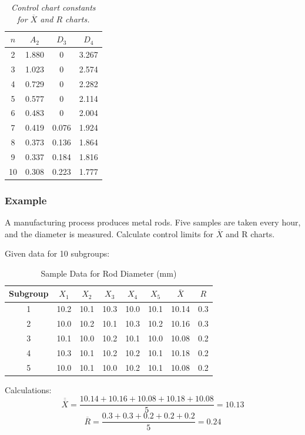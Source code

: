 \documentclass[twoside]{book}
\begin{document}
\begin{table}[H]
\centering
\begin{tabular}{c|ccc}
\toprule
$n$ & $A_2$ & $D_3$ & $D_4$ \\
\midrule
2 & 1.880 & 0 & 3.267 \\
3 & 1.023 & 0 & 2.574 \\
4 & 0.729 & 0 & 2.282 \\
5 & 0.577 & 0 & 2.114 \\
6 & 0.483 & 0 & 2.004 \\
7 & 0.419 & 0.076 & 1.924 \\
8 & 0.373 & 0.136 & 1.864 \\
9 & 0.337 & 0.184 & 1.816 \\
10 & 0.308 & 0.223 & 1.777 \\
\bottomrule
\end{tabular}
\caption{\textit{Control chart constants for $\overline{X}$ and $R$ charts.}}
\label{table:xbar-r-cc}
\end{table}


\subsubsection{Example}

A manufacturing process produces metal rods. Five samples are taken every hour, and the diameter is measured. Calculate control limits for $\overline{X}$ and R charts.

Given data for 10 subgroups:
\begin{table}[H]
\centering
\caption{Sample Data for Rod Diameter (mm)}
\begin{tabular}{c|ccccc|c|c}
\toprule
\textbf{Subgroup} & $X_1$ & $X_2$ & $X_3$ & $X_4$ & $X_5$ & $\bar{X}$ & $R$ \\
\midrule
1 & 10.2 & 10.1 & 10.3 & 10.0 & 10.1 & 10.14 & 0.3 \\
2 & 10.0 & 10.2 & 10.1 & 10.3 & 10.2 & 10.16 & 0.3 \\
3 & 10.1 & 10.0 & 10.2 & 10.1 & 10.0 & 10.08 & 0.2 \\
4 & 10.3 & 10.1 & 10.2 & 10.2 & 10.1 & 10.18 & 0.2 \\
5 & 10.0 & 10.1 & 10.0 & 10.2 & 10.1 & 10.08 & 0.2 \\
\bottomrule
\end{tabular}
\end{table}

Calculations:
$$\overline{\overline{X}} = \dfrac{10.14 + 10.16 + 10.08 + 10.18 + 10.08}{5} = 10.13$$
$$\overline{R} = \dfrac{0.3 + 0.3 + 0.2 + 0.2 + 0.2}{5} = 0.24$$
\end{document}
